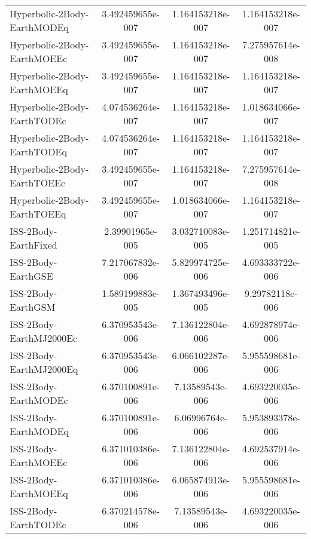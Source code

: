 \begin{table}[htbp!]
\begin{tabular}{lccc}
         Hyperbolic-2Body-EarthMODEq & 3.492459655e-007 & 1.164153218e-007 & 1.164153218e-007 \\
         Hyperbolic-2Body-EarthMOEEc & 3.492459655e-007 & 1.164153218e-007 & 7.275957614e-008 \\
         Hyperbolic-2Body-EarthMOEEq & 3.492459655e-007 & 1.164153218e-007 & 1.164153218e-007 \\
         Hyperbolic-2Body-EarthTODEc & 4.074536264e-007 & 1.164153218e-007 & 1.018634066e-007 \\
         Hyperbolic-2Body-EarthTODEq & 4.074536264e-007 & 1.164153218e-007 & 1.164153218e-007 \\
         Hyperbolic-2Body-EarthTOEEc & 3.492459655e-007 & 1.164153218e-007 & 7.275957614e-008 \\
         Hyperbolic-2Body-EarthTOEEq & 3.492459655e-007 & 1.018634066e-007 & 1.164153218e-007 \\
         ISS-2Body-EarthFixed & 2.39901965e-005 & 3.032710083e-005 & 1.251714821e-005 \\
         ISS-2Body-EarthGSE & 7.217067832e-006 & 5.829974725e-006 & 4.693333722e-006 \\
         ISS-2Body-EarthGSM & 1.589199883e-005 & 1.367493496e-005 & 9.29782118e-006 \\
         ISS-2Body-EarthMJ2000Ec & 6.370953543e-006 & 7.136122804e-006 & 4.692878974e-006 \\
         ISS-2Body-EarthMJ2000Eq & 6.370953543e-006 & 6.066102287e-006 & 5.955598681e-006 \\
         ISS-2Body-EarthMODEc & 6.370100891e-006 & 7.13589543e-006 & 4.693220035e-006 \\
         ISS-2Body-EarthMODEq & 6.370100891e-006 & 6.06996764e-006 & 5.953893378e-006 \\
         ISS-2Body-EarthMOEEc & 6.371010386e-006 & 7.136122804e-006 & 4.692537914e-006 \\
         ISS-2Body-EarthMOEEq & 6.371010386e-006 & 6.065874913e-006 & 5.955598681e-006 \\
         ISS-2Body-EarthTODEc & 6.370214578e-006 & 7.13589543e-006 & 4.693220035e-006 \\

\end{tabular}
\end{table}
